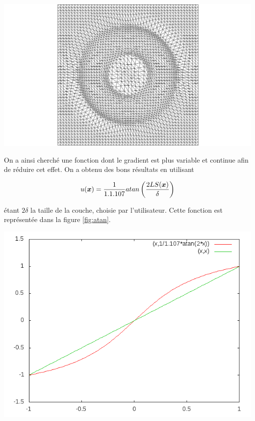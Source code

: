 \begingroup
  \centering
  \includegraphics[clip=true, trim = 10cm 0 10cm 0, scale=.22]{Bordeaux/figures/LSlin.png}
\endgroup

\indent

\indent On a ainsi cherché une fonction dont le gradient est plus variable et continue afin de réduire cet effet. On a obtenu des bons résultats en utilisant

\begin{equation}
	\label{eq:atan}
	u(\boldsymbol{x}) = \frac{1}{1.1.107} atan \left(\frac{2LS(\boldsymbol{x})}{\delta} \right)
\end{equation}

\noindent étant \(2\delta\) la taille de la couche, choisie par l'utilisateur. Cette fonction est représentée dans la figure \ref{fig:atan}.

\indent

\begingroup
  \centering
  \includegraphics[scale=.4]{Bordeaux/figures/atan.png}
\endgroup

